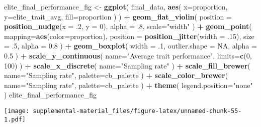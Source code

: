 \documentclass[]{book}
\newenvironment{Shaded}{\begin{snugshade}}{\end{snugshade}}
\newcommand{\DataTypeTok}[1]{\textcolor[rgb]{0.13,0.29,0.53}{#1}}
\newcommand{\DecValTok}[1]{\textcolor[rgb]{0.00,0.00,0.81}{#1}}
\newcommand{\FloatTok}[1]{\textcolor[rgb]{0.00,0.00,0.81}{#1}}
\newcommand{\KeywordTok}[1]{\textcolor[rgb]{0.13,0.29,0.53}{\textbf{#1}}}
\newcommand{\NormalTok}[1]{#1}
\newcommand{\OperatorTok}[1]{\textcolor[rgb]{0.81,0.36,0.00}{\textbf{#1}}}
\newcommand{\OtherTok}[1]{\textcolor[rgb]{0.56,0.35,0.01}{#1}}
\newcommand{\StringTok}[1]{\textcolor[rgb]{0.31,0.60,0.02}{#1}}
\begin{document}
\begin{Shaded}
\begin{Highlighting}[]
\NormalTok{elite_final_performance_fig <-}\StringTok{ }\KeywordTok{ggplot}\NormalTok{(}
\NormalTok{    final_data,}
    \KeywordTok{aes}\NormalTok{(}
      \DataTypeTok{x=}\NormalTok{proportion,}
      \DataTypeTok{y=}\NormalTok{elite_trait_avg,}
      \DataTypeTok{fill=}\NormalTok{proportion}
\NormalTok{    )}
\NormalTok{  ) }\OperatorTok{+}
\StringTok{  }\KeywordTok{geom_flat_violin}\NormalTok{(}
    \DataTypeTok{position =} \KeywordTok{position_nudge}\NormalTok{(}\DataTypeTok{x =} \FloatTok{.2}\NormalTok{, }\DataTypeTok{y =} \DecValTok{0}\NormalTok{),}
    \DataTypeTok{alpha =} \FloatTok{.8}\NormalTok{,}
    \DataTypeTok{scale=}\StringTok{"width"}
\NormalTok{  ) }\OperatorTok{+}
\StringTok{  }\KeywordTok{geom_point}\NormalTok{(}
    \DataTypeTok{mapping=}\KeywordTok{aes}\NormalTok{(}\DataTypeTok{color=}\NormalTok{proportion),}
    \DataTypeTok{position =} \KeywordTok{position_jitter}\NormalTok{(}\DataTypeTok{width =} \FloatTok{.15}\NormalTok{),}
    \DataTypeTok{size =} \FloatTok{.5}\NormalTok{,}
    \DataTypeTok{alpha =} \FloatTok{0.8}
\NormalTok{  ) }\OperatorTok{+}
\StringTok{  }\KeywordTok{geom_boxplot}\NormalTok{(}
    \DataTypeTok{width =} \FloatTok{.1}\NormalTok{,}
    \DataTypeTok{outlier.shape =} \OtherTok{NA}\NormalTok{,}
    \DataTypeTok{alpha =} \FloatTok{0.5}
\NormalTok{  ) }\OperatorTok{+}
\StringTok{  }\KeywordTok{scale_y_continuous}\NormalTok{(}
    \DataTypeTok{name=}\StringTok{"Average trait performance"}\NormalTok{,}
    \DataTypeTok{limits=}\KeywordTok{c}\NormalTok{(}\DecValTok{0}\NormalTok{, }\DecValTok{100}\NormalTok{)}
\NormalTok{  ) }\OperatorTok{+}
\StringTok{  }\KeywordTok{scale_x_discrete}\NormalTok{(}
    \DataTypeTok{name=}\StringTok{"Sampling rate"}
\NormalTok{  ) }\OperatorTok{+}
\StringTok{  }\KeywordTok{scale_fill_brewer}\NormalTok{(}
    \DataTypeTok{name=}\StringTok{"Sampling rate"}\NormalTok{,}
    \DataTypeTok{palette=}\NormalTok{cb_palette}
\NormalTok{  ) }\OperatorTok{+}
\StringTok{  }\KeywordTok{scale_color_brewer}\NormalTok{(}
    \DataTypeTok{name=}\StringTok{"Sampling rate"}\NormalTok{,}
    \DataTypeTok{palette=}\NormalTok{cb_palette}
\NormalTok{  ) }\OperatorTok{+}
\StringTok{  }\KeywordTok{theme}\NormalTok{(}
    \DataTypeTok{legend.position=}\StringTok{"none"}
\NormalTok{  )}
\NormalTok{elite_final_performance_fig}
\end{Highlighting}
\end{Shaded}

\texttt{[image: supplemental-material\_files/figure-latex/unnamed-chunk-55-1.pdf]}
\end{document}
